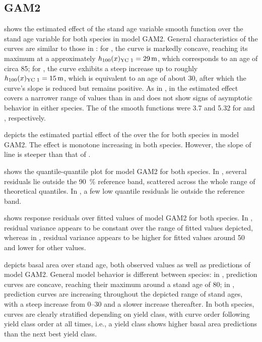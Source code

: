 \subsection{GAM2}

 shows the estimated effect of the stand age variable smooth function over the stand age variable for both species in model GAM2.  General characteristics of the curves are similar to those in :  for \Beech{}, the curve is markedly concave, reaching its maximum at a approximately \(h_{100}(x)_{\text{YC 1}}{} = \SI{29}{\meter}\), which corresponds to an age of circa \SI{85}{\year};  for \Spruce{}, the curve exhibits a steep increase up to roughly \(h_{100}(x)_{\text{YC 1}}{} = \SI{15}{\meter}\), which is equivalent to an age of about \SI{30}{\year}, after which the curve’s slope is reduced but remains positive.  As in , in \Beech{} the estimated effect covers a narrower range of values than in \Spruce{} and does not show signs of asymptotic behavior in either species.  The \edf{} of the smooth functions were \num{3.7} and \num{5.32} for \Beech{} and \Spruce{}, respectively.

 depicts the estimated partial effect of the \ProductivityIndexVariableText{} over the \ProductivityIndexVariableText{} for both species in model GAM2.  The effect is monotone increasing in both species.  However, the slope of \Beech{} line is steeper than that of \Spruce{}.

 shows the quantile-quantile plot for model GAM2 for both species.  In \Beech{}, several residuals lie outside the \SI{90}{\percent} reference band, scattered across the whole range of theoretical quantiles.  In \Spruce{}, a few  low quantile residuals lie outside the reference band.

 shows response residuals over fitted values of model GAM2 for both species.   In \Beech{}, residual variance appears to be constant over the range of fitted values depicted, whereas in \Spruce{}, residual variance appears to be higher for fitted values around \num{50} and lower for other values.

 depicts basal area over stand age, both observed values as well as predictions of model GAM2.  General model behavior is different between species:  in \Beech{}, prediction curves are concave, reaching their maximum around a stand age of \SI{80}{\year};  in \Spruce{}, prediction curves are increasing throughout the depicted range of stand ages, with a steep increase from \SIrange{0}{30}{\year} and a slower increase thereafter.  In both species, curves are clearly stratified depending on yield class, with curve order following yield class order at all times, i.e., a yield class shows higher basal area predictions than the next best yield class.

